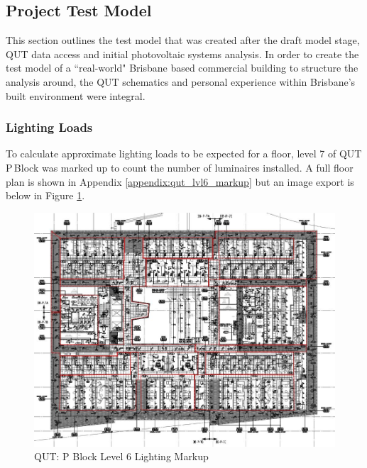 
\subsection{Project Test Model} \label{section:project-model}

This section outlines the test model that was created after the draft model stage, QUT data access and initial photovoltaic systems analysis. In order to create the test model of a ``real-world" Brisbane based commercial building to structure the analysis around, the QUT schematics and personal experience within Brisbane's built environment were integral. 

\subsubsection{Lighting Loads}

To calculate approximate lighting loads to be expected for a floor, level 7 of QUT P\,Block was marked up to count the number of luminaires installed. A full floor plan is shown in Appendix \ref{appendix:qut_lvl6_markup} but an image export is below in Figure \ref{fig:qut-lvl6-lighting-markup}.      

\begin{figure}[H]
	\hfill\includegraphics[width = 150mm]{images/project-model/qut-lvl7-lighting-markup}\hspace*{\fill}
	\caption{QUT: P Block Level 6 Lighting Markup} 
	\label{fig:qut-lvl6-lighting-markup}
\end{figure}

